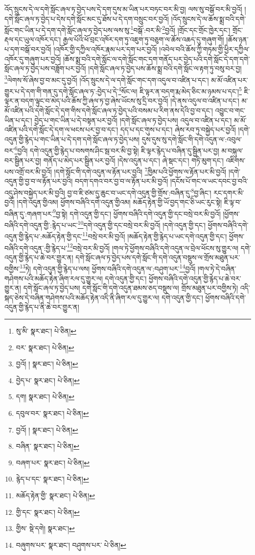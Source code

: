 འོད་སྲུངས་དེ་ལ་དགེ་སློང་ཞལ་ཏ་བྱེད་པས་དེ་དག་དུས་མ་ཡིན་པར་བཏང་བར་མི་བྱ། ལས་སུ་བསྒོ་བར་མི་བྱའོ། །དགེ་སློང་ཞལ་ཏ་བྱེད་པ་དེས་དགེ་སློང་མང་དུ་ཐོས་པ་དེ་དག་བསྲུང་བར་བྱའོ། །འོད་སྲུངས་དེ་ལ་ཆོས་སྨྲ་བའི་དགེ་སློང་གང་ཡིན་པ་དེ་དག་དགེ་སློང་ཞལ་ཏ་བྱེད་པས་ལས་སུ་\footnote{སུ་མི་  སྣར་ཐང་།  པེ་ཅིན། }བསྒོ་:བར་མི་\footnote{བར་  སྣར་ཐང་།  པེ་ཅིན། }བྱའོ། །གྲོང་དང་གྲོང་ཁྱེར་དང་། གྲོང་རྡལ་དང་ཡུལ་འཁོར་དང་། རྒྱལ་པོའི་ཕོ་བྲང་འཁོར་དག་ཏུ་འཇུག་ཏུ་བཅུག་ལ་ཆོས་འཆད་དུ་གཞུག་གོ། །ཆོས་ཉན་པ་དག་བསྒོ་བར་བྱའོ། །འཁོར་གྱི་དཀྱིལ་འཁོར་རྣམ་པར་དག་པར་བྱའོ། །འབེལ་བའི་ཆོས་ཀྱི་གཏམ་གྱི་ཕྱིར་དཀྱིལ་འཁོར་དུ་གཞུག་པར་བྱའོ། །ཆོས་སྨྲ་བའི་དགེ་སློང་ལ་དགེ་སློང་གང་དག་གནོད་པར་བྱེད་པའི་དགེ་སློང་དེ་དག་དགེ་སློང་ཞལ་ཏ་བྱེད་པས་བཟློག་པར་བྱའོ། །དགེ་སློང་ཞལ་ཏ་བྱེད་པས་ཆོས་སྨྲ་བའི་དགེ་སློང་ལ་རྟག་ཏུ་བསུ་བར་བྱ། \footnote{བྱའོ། །   སྣར་ཐང་།  པེ་ཅིན། }ལེགས་སོ་ཞེས་བྱ་བ་མང་དུ་བྱའོ། །འོད་སྲུངས་དེ་ལ་དགེ་སློང་གང་དག་འདུལ་བ་འཛིན་པ་དང་། མ་མོ་འཛིན་པར་གྱུར་པ་དེ་དག་གི་གན་དུ་དགེ་སློང་ཞལ་ཏ་:བྱེད་པ་དེ་\footnote{བྱེད་པ་  སྣར་ཐང་།  པེ་ཅིན། }སོང་ལ། ཇི་ལྟར་ན་བདག་རྨ་མེད་ཅིང་མ་ཉམས་པ་དང་།\footnote{དག།  སྣར་ཐང་།  པེ་ཅིན། } ཇི་ལྟར་ན་བདག་ལྟུང་བ་མེད་པའི་ཆོས་ཀྱི་ཞལ་ཏ་བྱ་ཞེས་ཡོངས་སུ་དྲི་བར་བྱའོ། །དེ་ནས་འདུལ་བ་འཛིན་པ་དང་། མ་མོ་འཛིན་པའི་དགེ་སློང་དེ་དག་གིས་དགེ་སློང་ཞལ་ཏ་བྱེད་པའི་བསམ་པ་རིག་ནས་དེའི་བྱ་བ་དང་། འབྱུང་བ་གང་ཡིན་པ་དང་། བྱེད་པ་གང་ཡིན་པ་དེ་བསྟན་པར་བྱའོ། །དགེ་སློང་ཞལ་ཏ་བྱེད་པས། འདུལ་བ་འཛིན་པ་དང་། མ་མོ་འཛིན་པའི་དགེ་སློང་དེ་དག་ལ་ཕངས་པར་བྱ་བ་དང་། དད་པ་དང་གུས་པ་དང་། ཞེས་རབ་ཏུ་བསྐྱེད་པར་བྱའོ། །དགེ་འདུན་གྱི་རྙེད་པ་གང་ཡིན་པ་དེ་དག་དགེ་སློང་ཞལ་ཏ་བྱེད་པས། དུས་དུས་སུ་དགེ་སློང་གི་དགེ་འདུན་ལ་:འབུལ་བར་\footnote{དབུལ་བར་  སྣར་ཐང་།  པེ་ཅིན། }བྱའི། དགེ་འདུན་གྱི་རྙེད་པ་བསགས་ཤིང་སྦ་བར་མི་བྱ་སྟེ། ཇི་ལྟར་རྙེད་པ་བཞིན་དུ་སྦྱིན་པར་བྱ། མ་བསྐུལ་བར་སྦྱིན་པར་བྱ། གནོད་པ་མེད་པར་སྦྱིན་པར་བྱའོ། །དེས་འདུན་པ་དང་། ཞེ་སྡང་དང་། གཏི་མུག་དང་། འཇིགས་པས་འགྲོ་བར་མི་བྱའོ། །དགེ་སློང་གི་དགེ་འདུན་ལ་རྟོན་པར་བྱའི། \footnote{བྱའོ། །   སྣར་ཐང་།  པེ་ཅིན། }ཁྱིམ་པའི་ཕྱོགས་ལ་རྟོན་པར་མི་བྱའོ། །དགེ་འདུན་གྱི་བྱ་བ་ལ་རྟོན་པར་བྱའི། བདག་དགའ་བར་བྱ་བ་ལ་རྟོན་པར་མི་བྱའོ། །དངོས་པོ་གང་ལ་ཡང་དབང་བྱ་བའི་འདུ་ཤེས་བསྐྱེད་པར་མི་བྱའི། བྱ་བ་ཇི་ཙམ་དུ་ཆུང་བ་ཡང་དགེ་འདུན་གྱི་གྲོས་:བཞིན་དུ་\footnote{བཞིན་  སྣར་ཐང་།  པེ་ཅིན། }བྱ་ཞིང་། རང་དགར་མི་བྱའོ། །དགེ་འདུན་གྱིའམ། ཕྱོགས་བཞིའི་དགེ་འདུན་གྱིའམ། མཆོད་རྟེན་གྱི་ཡོ་བྱད་གང་ཅི་ཡང་རུང་སྟེ། ཇི་ལྟ་བ་བཞིན་དུ་:གཞག་པར་\footnote{བཞག་པར་  སྣར་ཐང་།  པེ་ཅིན། }བྱ་སྟེ། དགེ་འདུན་གྱི་དང་། ཕྱོགས་བཞིའི་དགེ་འདུན་གྱི་དང་བསྲེ་བར་མི་བྱའོ། །ཕྱོགས་བཞིའི་དགེ་འདུན་གྱི་:རྙེད་པ་ཡང་\footnote{རྙེད་པ་དང་  སྣར་ཐང་།  པེ་ཅིན། }དགེ་འདུན་གྱི་དང་བསྲེ་བར་མི་བྱའོ། །དགེ་འདུན་གྱི་དང་། ཕྱོགས་བཞིའི་དགེ་འདུན་གྱི་རྙེད་པ་:མཆོད་རྟེན་གྱི་དང་\footnote{མཆོད་རྟེན་གྱི་  སྣར་ཐང་།  པེ་ཅིན། }བསྲེ་བར་མི་བྱའོ། །མཆོད་རྟེན་གྱི་རྙེད་པ་ཡང་དགེ་འདུན་གྱི་དང་། ཕྱོགས་བཞིའི་དགེ་འདུན་:གྱི་རྙེད་པ་\footnote{གྱི་དང་  སྣར་ཐང་།  པེ་ཅིན། }བསྲེ་བར་མི་བྱའོ། །གལ་ཏེ་ཕྱོགས་བཞིའི་དགེ་འདུན་ལ་བྲེལ་ཕོངས་སུ་གྱུར་ལ། དགེ་འདུན་གྱི་རྙེད་པ་ཆེ་བར་གྱུར་ན། དགེ་སློང་ཞལ་ཏ་བྱེད་པས་དགེ་སློང་གི་དགེ་འདུན་བསྡུས་ལ་གྲོས་མཐུན་པར་བགྱིས་\footnote{གྱིས་  སྡེ་དགེ།  སྣར་ཐང་། }ཏེ། དགེ་འདུན་གྱི་རྙེད་པ་ལས། ཕྱོགས་བཞིའི་དགེ་འདུན་ལ་:བཤུག་པར་\footnote{བཞུགས་པར་  སྣར་ཐང་། བཤུགས་པར་  པེ་ཅིན། }བྱའོ། །གལ་ཏེ་དེ་བཞིན་གཤེགས་པའི་མཆོད་རྟེན་ཞིག་རལ་དུ་གྱུར་ལ། དགེ་འདུན་གྱི་དང་། ཕྱོགས་བཞིའི་དགེ་འདུན་གྱི་རྙེད་པ་ཆེ་བར་གྱུར་ན། དགེ་སློང་ཞལ་ཏ་བྱེད་པས། དགེ་སློང་གི་དགེ་འདུན་ཐམས་ཅད་བསྡུས་ལ། གྲོས་མཐུན་པར་བགྱིས་ཏེ། འདི་སྐད་ཅེས་དེ་བཞིན་གཤེགས་པའི་མཆོད་རྟེན་འདི་ནི་ཞིག་རལ་དུ་གྱུར་ལ། དགེ་འདུན་གྱི་དང་། ཕྱོགས་བཞིའི་དགེ་འདུན་གྱི་རྙེད་པ་ནི་ཆེ་བར་གྱུར་ན། 